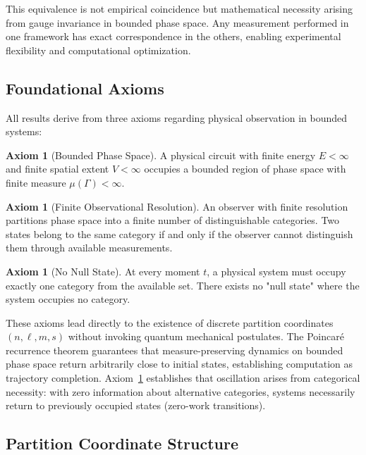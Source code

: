 \documentclass[12pt,a4paper]{article}
\theoremstyle{plain}
\theoremstyle{definition}
\newtheorem{axiom}[theorem]{Axiom}
\theoremstyle{remark}
\begin{document}
This equivalence is not empirical coincidence but mathematical necessity arising from gauge invariance in bounded phase space. Any measurement performed in one framework has exact correspondence in the others, enabling experimental flexibility and computational optimization.

\subsection{Foundational Axioms}

All results derive from three axioms regarding physical observation in bounded systems:

\begin{axiom}[Bounded Phase Space]
\label{ax:bounded}
A physical circuit with finite energy $E < \infty$ and finite spatial extent $V < \infty$ occupies a bounded region of phase space with finite measure $\mu(\Gamma) < \infty$.
\end{axiom}

\begin{axiom}[Finite Observational Resolution]
\label{ax:categorical}
An observer with finite resolution partitions phase space into a finite number of distinguishable categories. Two states belong to the same category if and only if the observer cannot distinguish them through available measurements.
\end{axiom}

\begin{axiom}[No Null State]
\label{ax:no_null_state}
At every moment $t$, a physical system must occupy exactly one category from the available set. There exists no "null state" where the system occupies no category.
\end{axiom}

These axioms lead directly to the existence of discrete partition coordinates $(n,\ell,m,s)$ without invoking quantum mechanical postulates. The Poincaré recurrence theorem guarantees that measure-preserving dynamics on bounded phase space return arbitrarily close to initial states, establishing computation as trajectory completion. Axiom~\ref{ax:no_null_state} establishes that oscillation arises from categorical necessity: with zero information about alternative categories, systems necessarily return to previously occupied states (zero-work transitions).

\subsection{Partition Coordinate Structure}
\end{document}
